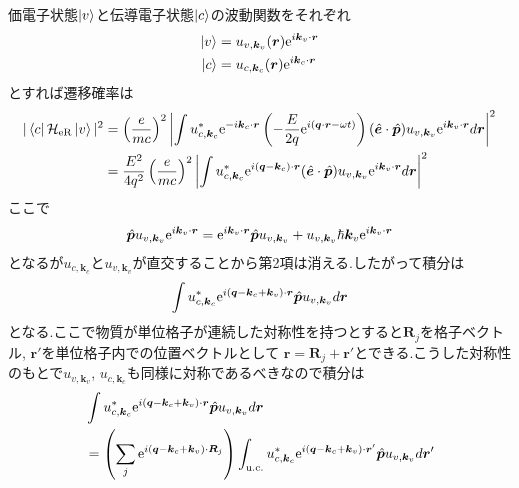 \documentclass[uplatex,a4j,11pt,dvipdfmx]{jsarticle}
\begin{document}
価電子状態$\ket{v}$と伝導電子状態$\ket{c}$の波動関数をそれぞれ
\begin{align}
  \ket{v}&=u_{v,{\bm k}_v}({\bm r}){\rm e}^{i{\bm k}_v\cdot{\bm r}}\\
  \ket{c}&=u_{c,{\bm k}_c}({\bm r}){\rm e}^{i{\bm k}_c\cdot{\bm r}}
\end{align}
とすれば遷移確率は
\begin{align}
  \begin{split}
    |\bra{c}\mathcal{H}_{\rm eR}\ket{v}|^2
    &=\left(\frac{e}{mc}\right)^2\left|\int u_{c,{\bm k}_c}^*{\rm e}^{-i{\bm k}_c\cdot{\bm r}}\left(-\frac{E}{2q}{\rm e}^{i({\bm q}\cdot{\bm r}-\omega t)}\right)
    (\hat{\bm e}\cdot\hat{\bm p})u_{v,{\bm k}_v}{\rm e}^{i{\bm k}_v\cdot{\bm r}}d{\bm r}
    \right|^2\\
    &=\frac{E^2}{4q^2}\left(\frac{e}{mc}\right)^2\left|\int u_{c,{\bm k}_c}^*{\rm e}^{i({\bm q}-{\bm k}_c)\cdot{\bm r}}
    (\hat{\bm e}\cdot\hat{\bm p})u_{v,{\bm k}_v}{\rm e}^{i{\bm k}_v\cdot{\bm r}}d{\bm r}
    \right|^2
  \end{split}
\end{align}
ここで
\begin{align}
  \hat{\bm p}u_{v,{\bm k}_v}{\rm e}^{i{\bm k}_v\cdot{\bm r}}={\rm e}^{i{\bm k}_v\cdot{\bm r}}\hat{\bm p}u_{v,{\bm k}_v}
  +u_{v,{\bm k}_v}\hbar{\bm k}_v{\rm e}^{i{\bm k}_v\cdot{\bm r}}
\end{align}
となるが$u_{c,{\bm k}_c}$と$u_{v,{\bm k}_v}$が直交することから第2項は消える.したがって積分は
\begin{align}
  \int u_{c,{\bm k}_c}^*{\rm e}^{i({\bm q}-{\bm k}_c+{\bm k}_v)\cdot{\bm r}}\hat{\bm p}u_{v,{\bm k}_v}d{\bm r}
\end{align}
となる.ここで物質が単位格子が連続した対称性を持つとすると${\bm R}_j$を格子ベクトル, ${\bm r}'$を単位格子内での位置ベクトルとして
${\bm r}={\bm R}_j+{\bm r}'$とできる.こうした対称性のもとで$u_{v,{\bm k}_v}$, $u_{c,{\bm k}_c}$も同様に対称であるべきなので積分は
\begin{align}
  \begin{split}
    \label{equ:integral_lattice_r}
    &\int u_{c,{\bm k}_c}^*{\rm e}^{i({\bm q}-{\bm k}_c+{\bm k}_v)\cdot{\bm r}}\hat{\bm p}u_{v,{\bm k}_v}d{\bm r}\\
    &=\left(\sum_j{\rm e}^{i({\bm q}-{\bm k}_c+{\bm k}_v)\cdot{\bm R}_j}\right)\int_{\rm u.c.} u_{c,{\bm k}_c}^*{\rm e}^{i({\bm q}-{\bm k}_c+{\bm k}_v)\cdot{\bm r}'}\hat{\bm p}u_{v,{\bm k}_v}d{\bm r}'
  \end{split}
\end{align}
\end{document}
